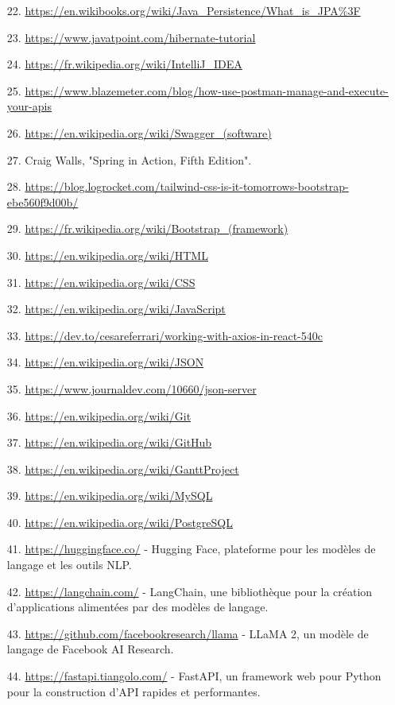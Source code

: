 \documentclass[a4paper, 11pt, openany]{report}
\begin{document}
\begin{itemize}
    \item[22.] \url{https://en.wikibooks.org/wiki/Java_Persistence/What_is_JPA%3F}
    \item[23.] \url{https://www.javatpoint.com/hibernate-tutorial}
    \item[24.] \url{https://fr.wikipedia.org/wiki/IntelliJ_IDEA}
    \item[25.] \url{https://www.blazemeter.com/blog/how-use-postman-manage-and-execute-your-apis}
    \item[26.] \url{https://en.wikipedia.org/wiki/Swagger_(software)}
    \item[27.] Craig Walls, "Spring in Action, Fifth Edition".
    \item[28.] \url{https://blog.logrocket.com/tailwind-css-is-it-tomorrows-bootstrap-ebe560f9d00b/}
    \item[29.] \url{https://fr.wikipedia.org/wiki/Bootstrap_(framework)}
    \item[30.] \url{https://en.wikipedia.org/wiki/HTML}
    \item[31.] \url{https://en.wikipedia.org/wiki/CSS}
    \item[32.] \url{https://en.wikipedia.org/wiki/JavaScript}
    \item[33.] \url{https://dev.to/cesareferrari/working-with-axios-in-react-540c}
    \item[34.] \url{https://en.wikipedia.org/wiki/JSON}
    \item[35.] \url{https://www.journaldev.com/10660/json-server}
    \item[36.] \url{https://en.wikipedia.org/wiki/Git}
    \item[37.] \url{https://en.wikipedia.org/wiki/GitHub}
    \item[38.] \url{https://en.wikipedia.org/wiki/GanttProject}
    \item[39.] \url{https://en.wikipedia.org/wiki/MySQL}
    \item[40.] \url{https://en.wikipedia.org/wiki/PostgreSQL}
    \item[41.] \url{https://huggingface.co/} - Hugging Face, plateforme pour les modèles de langage et les outils NLP.
    \item[42.] \url{https://langchain.com/} - LangChain, une bibliothèque pour la création d'applications alimentées par des modèles de langage.
    \item[43.] \url{https://github.com/facebookresearch/llama} - LLaMA 2, un modèle de langage de Facebook AI Research.
    \item[44.] \url{https://fastapi.tiangolo.com/} - FastAPI, un framework web pour Python pour la construction d'API rapides et performantes.
\end{itemize}
\end{document}
